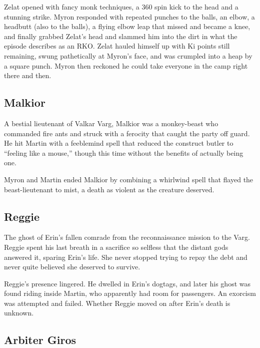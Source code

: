 Zelat opened with fancy monk techniques, a 360 spin kick to the head and a stunning strike.  Myron responded with repeated punches to the balls, an elbow, a headbutt (also to the balls), a flying elbow leap that missed and became a knee, and finally grabbed Zelat's head and slammed him into the dirt in what the episode describes as an RKO.  Zelat hauled himself up with Ki points still remaining, swung pathetically at Myron's face, and was crumpled into a heap by a square punch.  Myron then reckoned he could take everyone in the camp right there and then.

\smallskip

\subsection*{Malkior}

\noindent

A bestial lieutenant of Valkar Varg, Malkior was a monkey-beast who commanded fire ants and struck with a ferocity that caught the party off guard.  He hit Martin with a feeblemind spell that reduced the construct butler to ``feeling like a mouse,'' though this time without the benefits of actually being one.

Myron and Martin ended Malkior by combining a whirlwind spell that flayed the beast-lieutenant to mist, a death as violent as the creature deserved.

\smallskip

\subsection*{Reggie}

\noindent

The ghost of Erin's fallen comrade from the reconnaissance mission to the Varg.  Reggie spent his last breath in a sacrifice so selfless that the distant gods answered it, sparing Erin's life.  She never stopped trying to repay the debt and never quite believed she deserved to survive.

Reggie's presence lingered.  He dwelled in Erin's dogtags, and later his ghost was found riding inside Martin, who apparently had room for passengers.  An exorcism was attempted and failed.  Whether Reggie moved on after Erin's death is unknown.

\smallskip

\subsection*{Arbiter Giros}

